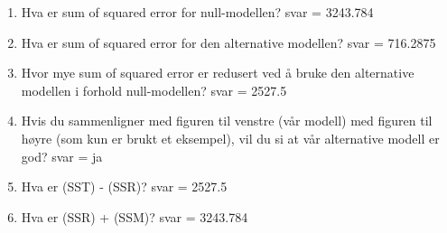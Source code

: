 \documentclass[
]{book}
\begin{document}
\begin{enumerate}
\def\labelenumi{\alph{enumi}.}
\item
  Hva er sum of squared error for null-modellen? svar = 3243.784
\item
  Hva er sum of squared error for den alternative modellen? svar = 716.2875
\item
  Hvor mye sum of squared error er redusert ved å bruke den alternative modellen i forhold null-modellen? svar = 2527.5
\item
  Hvis du sammenligner med figuren til venstre (vår modell) med figuren til høyre (som kun er brukt et eksempel), vil du si at vår alternative modell er god? svar = ja
\item
  Hva er (SST) - (SSR)? svar = 2527.5
\item
  Hva er (SSR) + (SSM)? svar = 3243.784
\end{enumerate}

  
\end{document}
